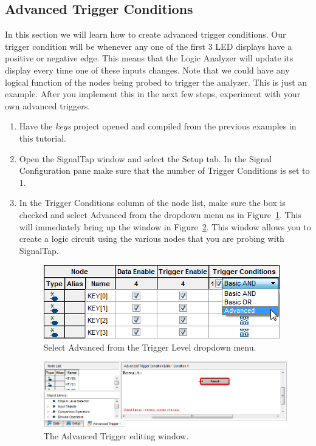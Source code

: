 \documentclass[11pt, twoside, pdftex]{article}
\begin{document}
\subsection{Advanced Trigger Conditions}
In this section we will learn how to create advanced trigger conditions. Our trigger condition will
be whenever any one of the first 3 LED displays  have a positive or negative edge. This means that the Logic Analyzer will
update its display every time one of these inputs changes. Note that we could have any logical function of the nodes being
probed to trigger the analyzer. This is just an example. After you implement this in the next few steps, experiment
with your own advanced triggers. 
\begin{enumerate}
\item Have the {\it keys} project opened and compiled from the previous examples in this tutorial.
  
\item Open the SignalTap window and select the Setup tab. In the Signal Configuration pane make sure that the number
of Trigger Conditions is set to 1.
  
\item In the Trigger Conditions column of the node list, make sure the box is checked and select {\sf Advanced} from the dropdown
menu as in Figure~\ref{fig:17}. This will immediately bring up the window in Figure~\ref{fig:18}. This window allows you to create a logic circuit using
the various nodes that you are probing with SignalTap.
  
\begin{figure}[H]
   \begin{center}
      \includegraphics[scale=0.65]{figures/figure17.png}
   \caption{Select Advanced from the Trigger Level dropdown menu.} 
	 \label{fig:17}
	 \end{center}
\end{figure}

\begin{figure}[H]
   \begin{center}
      \includegraphics[scale=0.65]{figures/figure18.png}
   \caption{The Advanced Trigger editing window.} 
	 \label{fig:18}
	 \end{center}
\end{figure}


\end{enumerate}
\end{document}
